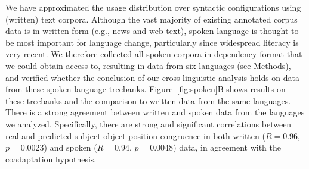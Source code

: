 \documentclass[11pt,a4paper]{article}
\newcommand\comment[1]{{\color{red}#1}}
\newcommand\mhahn[1]{{\color{red}(#1)}}
\begin{document}


We have approximated the usage distribution over syntactic configurations using (written) text corpora.
Although the vast majority of existing annotated corpus data is in written form (e.g., news and web text), spoken language is thought to be most important for language change, particularly since widespread literacy is very recent.
We therefore collected all spoken corpora in dependency format that we could obtain access to, resulting in data from six languages (see Methods), and verified whether the conclusion of our cross-linguistic analysis holds on data from these spoken-language treebanks. Figure~\ref{fig:spoken}B
shows results on these treebanks and the comparison to written data from the same languages.
There is a strong agreement between written and spoken data from the languages we analyzed. Specifically, there are strong and significant correlations between real and predicted subject-object position congruence in both written ($R=0.96$, $p=0.0023$) and spoken ($R=0.94$, $p=0.0048$) data, in agreement with the coadaptation hypothesis.





\end{document}
